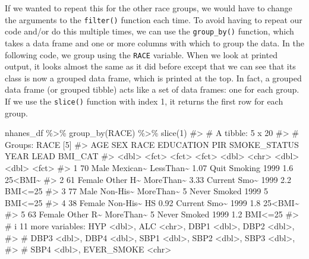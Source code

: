 \documentclass[
  letterpaper,
]{latex/krantz}
\makeatletter
\newenvironment{Shaded}{\begin{snugshade}}{\end{snugshade}}
\newcommand{\CommentTok}[1]{\textcolor[rgb]{0.37,0.37,0.37}{#1}}
\newcommand{\DecValTok}[1]{\textcolor[rgb]{0.68,0.00,0.00}{#1}}
\newcommand{\FunctionTok}[1]{\textcolor[rgb]{0.28,0.35,0.67}{#1}}
\newcommand{\NormalTok}[1]{\textcolor[rgb]{0.00,0.23,0.31}{#1}}
\newcommand{\SpecialCharTok}[1]{\textcolor[rgb]{0.37,0.37,0.37}{#1}}
\newenvironment{kframe}{%
\medskip{}
\setlength{\fboxsep}{.8em}
 \def\at@end@of@kframe{}%
 \ifinner\ifhmode%
  \def\at@end@of@kframe{\end{minipage}}%
  \begin{minipage}{\columnwidth}%
 \fi\fi%
 \def\FrameCommand##1{\hskip\@totalleftmargin \hskip-\fboxsep
 \colorbox{shadecolor}{##1}\hskip-\fboxsep
     \hskip-\linewidth \hskip-\@totalleftmargin \hskip\columnwidth}%
 \MakeFramed {\advance\hsize-\width
   \@totalleftmargin\z@ \linewidth\hsize
   \@setminipage}}%
 {\par\unskip\endMakeFramed%
 \at@end@of@kframe}
\renewenvironment{Shaded}{\begin{kframe}}{\end{kframe}}
\makeatother
\begin{document}
If we wanted to repeat this for the other race groups, we would have to
change the arguments to the \texttt{filter()} function each time. To
avoid having to repeat our code and/or do this multiple times, we can
use the
\texttt{group\_by()}
function, which takes a data frame and one or more columns with which to
group the data. In the following code, we group using the \texttt{RACE}
variable. When we look at printed output, it looks almost the same as it
did before except that we can see that its class is now a grouped data
frame, which is printed at the top. In fact, a grouped data frame (or
grouped tibble) acts like a set of data frames: one for each group. If
we use the \texttt{slice()}
function with index 1, it returns the first row for each group.

\begin{Shaded}
\begin{Highlighting}[]
\NormalTok{nhanes\_df }\SpecialCharTok{\%\textgreater{}\%} 
  \FunctionTok{group\_by}\NormalTok{(RACE) }\SpecialCharTok{\%\textgreater{}\%}
  \FunctionTok{slice}\NormalTok{(}\DecValTok{1}\NormalTok{)}
\CommentTok{\#\textgreater{} \# A tibble: 5 x 20}
\CommentTok{\#\textgreater{} \# Groups:   RACE [5]}
\CommentTok{\#\textgreater{}     AGE SEX    RACE     EDUCATION   PIR SMOKE\_STATUS  YEAR  LEAD BMI\_CAT}
\CommentTok{\#\textgreater{}   \textless{}dbl\textgreater{} \textless{}fct\textgreater{}  \textless{}fct\textgreater{}    \textless{}fct\textgreater{}     \textless{}dbl\textgreater{} \textless{}chr\textgreater{}        \textless{}dbl\textgreater{} \textless{}dbl\textgreater{} \textless{}fct\textgreater{}  }
\CommentTok{\#\textgreater{} 1    70 Male   Mexican\textasciitilde{} LessThan\textasciitilde{}  1.07 Quit Smoking  1999   1.6 25\textless{}BMI\textasciitilde{}}
\CommentTok{\#\textgreater{} 2    61 Female Other H\textasciitilde{} MoreThan\textasciitilde{}  3.33 Current Smo\textasciitilde{}  1999   2.2 BMI\textless{}=25}
\CommentTok{\#\textgreater{} 3    77 Male   Non{-}His\textasciitilde{} MoreThan\textasciitilde{}  5    Never Smoked  1999   5   BMI\textless{}=25}
\CommentTok{\#\textgreater{} 4    38 Female Non{-}His\textasciitilde{} HS         0.92 Current Smo\textasciitilde{}  1999   1.8 25\textless{}BMI\textasciitilde{}}
\CommentTok{\#\textgreater{} 5    63 Female Other R\textasciitilde{} MoreThan\textasciitilde{}  5    Never Smoked  1999   1.2 BMI\textless{}=25}
\CommentTok{\#\textgreater{} \# i 11 more variables: HYP \textless{}dbl\textgreater{}, ALC \textless{}chr\textgreater{}, DBP1 \textless{}dbl\textgreater{}, DBP2 \textless{}dbl\textgreater{},}
\CommentTok{\#\textgreater{} \#   DBP3 \textless{}dbl\textgreater{}, DBP4 \textless{}dbl\textgreater{}, SBP1 \textless{}dbl\textgreater{}, SBP2 \textless{}dbl\textgreater{}, SBP3 \textless{}dbl\textgreater{},}
\CommentTok{\#\textgreater{} \#   SBP4 \textless{}dbl\textgreater{}, EVER\_SMOKE \textless{}chr\textgreater{}}
\end{Highlighting}
\end{Shaded}
\end{document}
